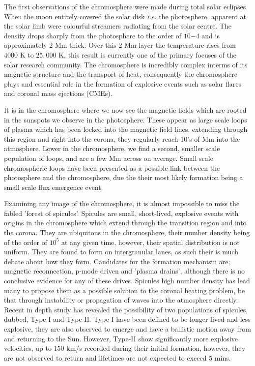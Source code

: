 The first observations of the chromosphere were made during total solar eclipses.
When the moon entirely covered the solar disk \emph{i.e.} the photosphere, apparent at the solar limb were colourful streamers radiating from the solar centre.
The density drops sharply from the photosphere to the order of $10{-4}$ and is approximately $2$ Mm thick. 
Over this $2$ Mm layer the temperature rises from $4000$ K to $25,000$ K, this result is currently one of the primary focuses of the solar research community.
The chromosphere is incredibly complex interms of its magnetic structure and the transport of heat, consequently the chromosphere plays and essential role in the formation of explosive events such as solar flares and coronal mass ejections (CMEs).

It is in the chromosphere where we now see the magnetic fields which are rooted in the sunspots we observe in the photosphere.
These appear as large scale loops of plasma which has been locked into the magnetic field lines, extending through this region and right into the corona, they regularly reach 10's of Mm into the atmosphere.
Lower in the chromosphere, we find a second, smaller scale population of loops, and are a few Mm across on average.
Small scale chromospheric loops have been presented as a possible link between the photosphere and the chromosphere, due the their most likely formation being a small scale flux emergence event.

Examining any image of the chromosphere, it is almost impossible to miss the fabled 'forest of spicules'.
Spicules are small, short-lived, explosive events with origins in the chromosphere which extend through the transition region and into the corona.
They are ubiquitous in the chromosphere, their number density being of the order of $10^5$ at any given time, however, their spatial distribution is not uniform.
They are found to form on intergranular lanes, as such their is much debate about how they form.
Candidates for the formation mechanism are; magnetic reconnection, p-mode driven and 'plasma drains', although there is no conclusive evidence for any of these drives.
Spicules high number density has lead many to propose them as a possible solution to the coronal heating problem, be that through instability or propagation of waves into the atmosphere directly.
Recent in depth study has revealed the possibility of two populations of spicules, dubbed, Type-I and Type-II.
Type-I have been defined to be longer lived and less explosive, they are also observed to emerge and have a ballistic motion away from and returning to the Sun.
However, Type-II show significantly more explosive velocities, up to $150$ km/s recorded during their initial formation, however, they are not observed to return and lifetimes are not expected to exceed $5$ mins. 

